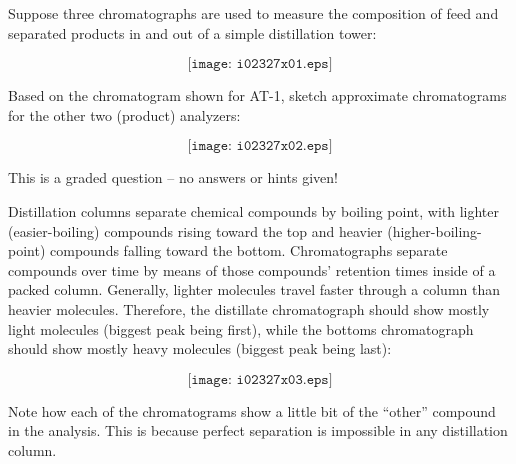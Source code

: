 

Suppose three chromatographs are used to measure the composition of feed and separated products in and out of a simple distillation tower:

$$\texttt{[image: i02327x01.eps]}$$

Based on the chromatogram shown for AT-1, sketch approximate chromatograms for the other two (product) analyzers:

$$\texttt{[image: i02327x02.eps]}$$

\vfil 

\eject






This is a graded question -- no answers or hints given!







Distillation columns separate chemical compounds by boiling point, with lighter (easier-boiling) compounds rising toward the top and heavier (higher-boiling-point) compounds falling toward the bottom.  Chromatographs separate compounds over time by means of those compounds' retention times inside of a packed column.  Generally, lighter molecules travel faster through a column than heavier molecules.  Therefore, the distillate chromatograph should show mostly light molecules (biggest peak being first), while the bottoms chromatograph should show mostly heavy molecules (biggest peak being last):

$$\texttt{[image: i02327x03.eps]}$$

Note how each of the chromatograms show a little bit of the ``other'' compound in the analysis.  This is because perfect separation is impossible in any distillation column.




